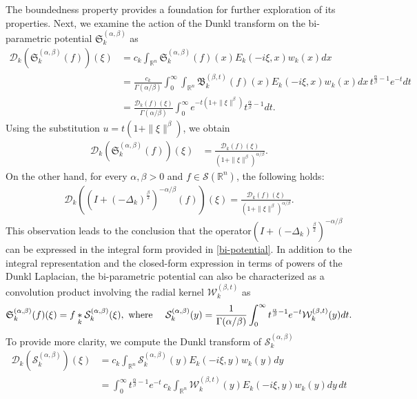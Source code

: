 \documentclass[11pt,a4paper,reqno]{amsproc}
\theoremstyle{definition}
\theoremstyle{remark}
\numberwithin{equation}{section}
\begin{document}
  The boundedness property provides a foundation for further exploration of its properties. Next, we examine the action of the Dunkl transform on the bi-parametric potential $\mathfrak{S}_k^{(\alpha, \beta)}$ as
\begin{align*}
   \mathcal{D}_k\left(\mathfrak{S}_k^{(\alpha,  \beta)} (f)\right)(\xi)& = c_k \int_{\mathbb{R}^n} \mathfrak{S}_k^{(\alpha,  \beta)} (f)(x) E_k(-i\xi,x) w_k(x)dx \\
    &= \frac{c_k}{\Gamma(\alpha/\beta)} \int_0^\infty \int_{\mathbb{R}^n} \mathfrak{B}_k^{(\beta,t)}(f)(x) E_k(-i\xi,x) w_k(x)dx\, t^{\frac{\alpha}{\beta}-1}e^{-t}dt\\
    &= \frac{\mathcal{D}_k(f)(\xi)}{\Gamma(\alpha/\beta)} \int_0^\infty e^{-t(1+\|\xi\|^\beta)} t^{\frac{\alpha}{\beta}-1} dt.
\end{align*} Using the substitution $u=t(1+\|\xi\|^\beta)$, we obtain 
\begin{align*}
    \mathcal{D}_k\left(\mathfrak{S}_k^{(\alpha, \beta)} (f)\right)(\xi)& =  \frac{\mathcal{D}_k(f)(\xi)}{(1+\|\xi\|^\beta)^{\alpha/\beta}}.
\end{align*}
On the other hand, for every $\alpha, \beta>0$ and $f \in \mathcal{S}(\mathbb{R}^n)$,  the following holds:
\begin{align*}
    \mathcal{D}_k \left( \left(I+\left({-\Delta_k}\right)^{\frac{\beta}{2}} \right)^{-\alpha/\beta}(f)\right)(\xi)= \frac{\mathcal{D}_k(f)(\xi)}{(1+\|\xi\|^\beta)^{\alpha/\beta}}.
\end{align*}
This observation leads to the conclusion that the operator$\left(I+\left({-\Delta_k}\right)^{\frac{\beta}{2}}\right)^{-\alpha/\beta}$ can be expressed in the integral form provided in \eqref{bi-potential}. 
In addition to the integral representation and the closed-form expression in terms of powers of the Dunkl Laplacian, the bi-parametric potential can also be characterized as a convolution product involving the radial kernel $\mathcal{W}_k^{(\beta,t)}$ as 
\begin{align*}
    \mathfrak{S}_k^{(\alpha, \beta)}(f)(\xi) = f\underset{k}{\ast} \mathcal{S}_k^{(\alpha, \beta)}(\xi), \text{  where  \quad }  \mathcal{S}_k^{(\alpha, \beta)}(y) = \frac{1}{\Gamma(\alpha/\beta)}\int_0^\infty t^{\frac{\alpha}{\beta}-1}e^{-t}\mathcal{W}_k^{(\beta,t)}(y)dt.
\end{align*}
To provide more clarity, we compute the Dunkl transform of $\mathcal{S}_k^{(\alpha, \beta)}$
\begin{align*}
    \mathcal{D}_k\left( \mathcal{S}_k^{(\alpha, \beta)} \right)(\xi) &= c_k \int_{\mathbb{R}^n} \mathcal{S}_k^{(\alpha, \beta)}(y) E_k(-i\xi,y)w_k(y)dy \\
    & = \int_0^\infty t^{\frac{\alpha}{\beta}-1}e^{-t}\, c_k \int_{\mathbb{R}^n} \mathcal{W}_k^{(\beta,t)}(y) E_k(-i\xi,y)w_k(y)dy\, dt
\end{align*} 
\end{document}
